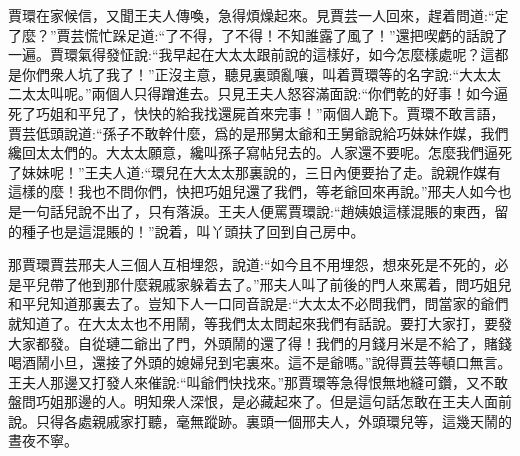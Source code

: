 \begin{parag}
    賈環在家候信，又聞王夫人傳喚，急得煩燥起來。見賈芸一人回來，趕着問道:“定了麼？”賈芸慌忙跺足道:“了不得，了不得！不知誰露了風了！”還把喫虧的話說了一遍。賈環氣得發怔說:“我早起在大太太跟前說的這樣好，如今怎麼樣處呢？這都是你們衆人坑了我了！”正沒主意，聽見裏頭亂嚷，叫着賈環等的名字說:“大太太二太太叫呢。”兩個人只得蹭進去。只見王夫人怒容滿面說:“你們乾的好事！如今逼死了巧姐和平兒了，快快的給我找還屍首來完事！”兩個人跪下。賈環不敢言語，賈芸低頭說道:“孫子不敢幹什麼，爲的是邢舅太爺和王舅爺說給巧妹妹作媒，我們纔回太太們的。大太太願意，纔叫孫子寫帖兒去的。人家還不要呢。怎麼我們逼死了妹妹呢！”王夫人道:“環兒在大太太那裏說的，三日內便要抬了走。說親作媒有這樣的麼！我也不問你們，快把巧姐兒還了我們，等老爺回來再說。”邢夫人如今也是一句話兒說不出了，只有落淚。王夫人便罵賈環說:“趙姨娘這樣混賬的東西，留的種子也是這混賬的！”說着，叫丫頭扶了回到自己房中。
\end{parag}


\begin{parag}
    那賈環賈芸邢夫人三個人互相埋怨，說道:“如今且不用埋怨，想來死是不死的，必是平兒帶了他到那什麼親戚家躲着去了。”邢夫人叫了前後的門人來罵着，問巧姐兒和平兒知道那裏去了。豈知下人一口同音說是:“大太太不必問我們，問當家的爺們就知道了。在大太太也不用鬧，等我們太太問起來我們有話說。要打大家打，要發大家都發。自從璉二爺出了門，外頭鬧的還了得！我們的月錢月米是不給了，賭錢喝酒鬧小旦，還接了外頭的媳婦兒到宅裏來。這不是爺嗎。”說得賈芸等頓口無言。王夫人那邊又打發人來催說:“叫爺們快找來。”那賈環等急得恨無地縫可鑽，又不敢盤問巧姐那邊的人。明知衆人深恨，是必藏起來了。但是這句話怎敢在王夫人面前說。只得各處親戚家打聽，毫無蹤跡。裏頭一個邢夫人，外頭環兒等，這幾天鬧的晝夜不寧。
\end{parag}


